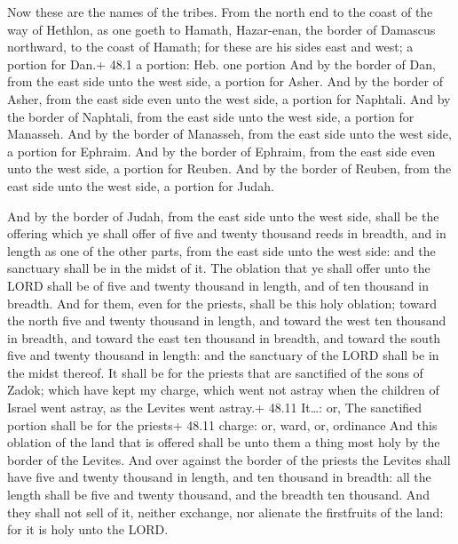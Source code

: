  Now these are the names of the tribes. From the north end
to the coast of the way of Hethlon, as one goeth to Hamath, Hazar-enan,
the border of Damascus northward, to the coast of Hamath; for these are
his sides east and west; a portion for Dan.+ 48.1 a portion: Heb. one
portion  And by the border of Dan, from the east side unto
the west side, a portion for Asher.  And by the border of
Asher, from the east side even unto the west side, a portion for
Naphtali.  And by the border of Naphtali, from the east side
unto the west side, a portion for Manasseh.  And by the
border of Manasseh, from the east side unto the west side, a portion for
Ephraim.  And by the border of Ephraim, from the east side
even unto the west side, a portion for Reuben.  And by the
border of Reuben, from the east side unto the west side, a portion for
Judah.

 And by the border of Judah, from the east side unto the
west side, shall be the offering which ye shall offer of five and twenty
thousand reeds in breadth, and in length as one of the other parts, from
the east side unto the west side: and the sanctuary shall be in the
midst of it.  The oblation that ye shall offer unto the LORD
shall be of five and twenty thousand in length, and of ten thousand in
breadth.  And for them, even for the priests, shall be this
holy oblation; toward the north five and twenty thousand in length, and
toward the west ten thousand in breadth, and toward the east ten
thousand in breadth, and toward the south five and twenty thousand in
length: and the sanctuary of the LORD shall be in the midst thereof.
 It shall be for the priests that are sanctified of the
sons of Zadok; which have kept my charge, which went not astray when the
children of Israel went astray, as the Levites went astray.+ 48.11
It\ldots: or, The sanctified portion shall be for the priests+ 48.11
charge: or, ward, or, ordinance  And this oblation of the
land that is offered shall be unto them a thing most holy by the border
of the Levites.  And over against the border of the priests
the Levites shall have five and twenty thousand in length, and ten
thousand in breadth: all the length shall be five and twenty thousand,
and the breadth ten thousand.  And they shall not sell of
it, neither exchange, nor alienate the firstfruits of the land: for it
is holy unto the LORD.

